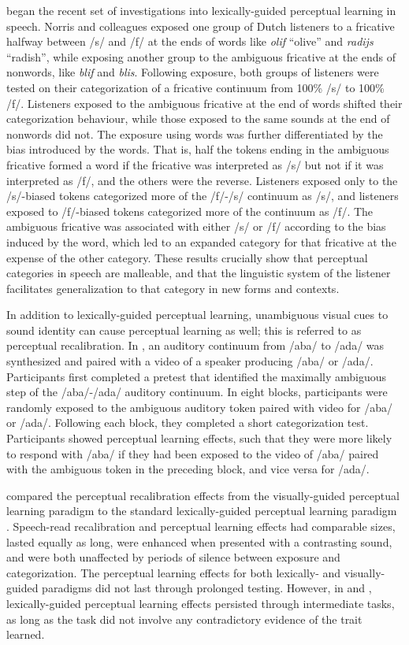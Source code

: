 \citet{Norris2003} began the recent set of investigations into lexically-guided perceptual learning in speech.
Norris and colleagues exposed one group of Dutch listeners to a fricative halfway between /s/ and /f/ at the ends of words like \emph{olif} ``olive'' and \emph{radijs} ``radish'', while exposing another group to the ambiguous fricative at the ends of nonwords, like \emph{blif} and \emph{blis}.
Following exposure, both groups of listeners were tested on their categorization of a fricative continuum from 100\% /s/ to 100\% /f/. 
Listeners exposed to the ambiguous fricative at the end of words shifted their categorization behaviour, while those exposed to the same sounds at the end of nonwords did not.  The exposure using words was further differentiated by the bias introduced by the words.  That is, half the tokens ending in the ambiguous fricative formed a word if the fricative was interpreted as /s/ but not if it was interpreted as /f/, and the others were the reverse.  
Listeners exposed only to the /s/-biased tokens categorized more of the /f/-/s/ continuum as /s/, and listeners exposed to /f/-biased tokens categorized more of the continuum as /f/.  
The ambiguous fricative was associated with either /s/ or /f/ according to the bias induced by the word, which led to an expanded category for that fricative at the expense of the other category.
These results crucially show that perceptual categories in speech are malleable, and that the linguistic system of the listener facilitates generalization to that category in new forms and contexts.

In addition to lexically-guided perceptual learning, unambiguous visual cues to sound identity can cause perceptual learning as well; this is referred to as perceptual recalibration.
In \citet{Bertelson2003}, an auditory continuum from /aba/ to /ada/ was synthesized and paired with a video of a speaker producing /aba/ or /ada/.  
Participants first completed a pretest that identified the maximally ambiguous step of the /aba/-/ada/ auditory continuum. 
In eight blocks, participants were randomly exposed to the ambiguous auditory token paired with video for /aba/ or /ada/.  Following each block, they completed a short categorization test.  
Participants showed perceptual learning effects, such that they were more likely to respond with /aba/ if they had been exposed to the video of /aba/ paired with the ambiguous token in the preceding block, and vice versa for /ada/.

\citet{vanLinden2007} compared the perceptual recalibration effects from the visually-guided perceptual learning paradigm \citep{Bertelson2003} to the standard lexically-guided perceptual learning paradigm \citep{Norris2003}.  
Speech-read recalibration and perceptual learning effects had comparable sizes, lasted equally as long, were enhanced when presented with a contrasting sound, and were both unaffected by periods of silence between exposure and categorization.  
The perceptual learning effects for both lexically- and visually-guided paradigms did not last through prolonged testing.
However, in \citet{Kraljic2005} and \citet{Eisner2006}, lexically-guided perceptual learning effects persisted through intermediate tasks, as long as the task did not involve any contradictory evidence of the trait learned.

